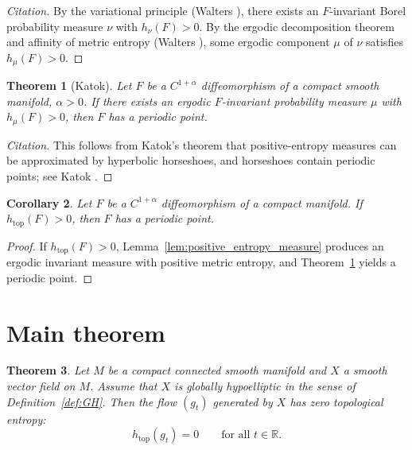 \documentclass[11pt]{article}
\newtheorem{theorem}{Theorem}[section]
\newtheorem{corollary}[theorem]{Corollary}
\theoremstyle{definition}
\theoremstyle{remark}
\newcommand{\R}{\mathbb{R}}
\newcommand{\htop}{h_{\mathrm{top}}}
\begin{document}
\begin{proof}[Citation]
By the variational principle (Walters \cite[\S8.2]{Walters}), there exists an $F$-invariant Borel probability measure $\nu$
with $h_\nu(F)>0$.
By the ergodic decomposition theorem and affinity of metric entropy (Walters \cite[\S8.3]{Walters}),
some ergodic component $\mu$ of $\nu$ satisfies $h_\mu(F)>0$.
\end{proof}

\begin{theorem}[Katok]\label{thm:katok}
Let $F$ be a $C^{1+\alpha}$ diffeomorphism of a compact smooth manifold, $\alpha>0$.
If there exists an ergodic $F$-invariant probability measure $\mu$ with $h_\mu(F)>0$, then $F$ has a periodic point.
\end{theorem}

\begin{proof}[Citation]
This follows from Katok's theorem that positive-entropy measures can be approximated by hyperbolic horseshoes,
and horseshoes contain periodic points; see Katok \cite{Katok80}.
\end{proof}

\begin{corollary}\label{cor:positive_entropy_periodic}
Let $F$ be a $C^{1+\alpha}$ diffeomorphism of a compact manifold.
If $\htop(F)>0$, then $F$ has a periodic point.
\end{corollary}

\begin{proof}
If $\htop(F)>0$, Lemma~\ref{lem:positive_entropy_measure} produces an ergodic invariant measure with positive metric entropy,
and Theorem~\ref{thm:katok} yields a periodic point.
\end{proof}

\section{Main theorem}

\begin{theorem}\label{thm:main}
Let $M$ be a compact connected smooth manifold and $X$ a smooth vector field on $M$.
Assume that $X$ is globally hypoelliptic in the sense of Definition~\ref{def:GH}.
Then the flow $(g_t)$ generated by $X$ has zero topological entropy:
\[
\htop(g_t)=0\qquad\text{for all }t\in\R.
\]
\end{theorem}
\end{document}
